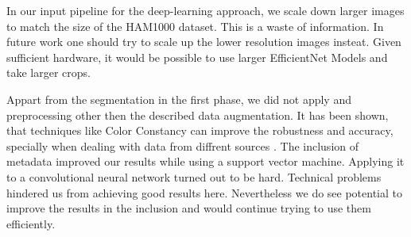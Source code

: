 In our input pipeline for the deep-learning approach, we scale down larger images to match the size of the HAM1000 dataset. This is a waste of information. In future work one should try to scale up the lower resolution images insteat. Given sufficient hardware, it would be possible to use larger EfficientNet Models and take larger crops. 

Appart from the segmentation in the first phase, we did not apply and preprocessing other then the described data augmentation. It has been shown, that techniques like Color Constancy can improve the robustness and accuracy, specially when dealing with data from diffrent sources \cite{color}. 
The inclusion of metadata improved our results while using a support vector machine. Applying it to a convolutional neural network turned out to be hard. Technical problems hindered us from achieving good results here. Nevertheless we do see potential to improve the results in the inclusion and would continue trying to use them efficiently.  